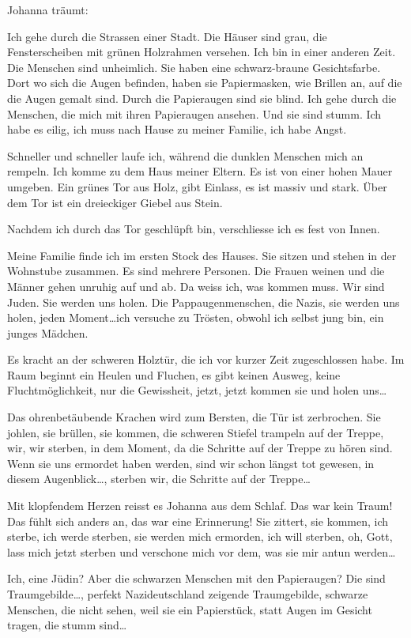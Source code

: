 \documentclass[10pt,a5paper]{book}
\begin{document}
Johanna träumt:

Ich gehe durch die Strassen einer Stadt. Die Häuser sind grau, die Fensterscheiben mit grünen Holzrahmen versehen. Ich bin in einer anderen Zeit. Die Menschen sind unheimlich. Sie haben eine schwarz-braune Gesichtsfarbe. Dort wo sich die Augen befinden, haben sie Papiermasken, wie Brillen an, auf die die Augen gemalt sind. Durch die Papieraugen sind sie blind. Ich gehe durch die Menschen,  die mich mit ihren Papieraugen ansehen. Und sie sind stumm. Ich habe es eilig, ich muss nach Hause zu meiner Familie, ich habe Angst.

Schneller und schneller laufe ich, während die dunklen Menschen mich an rempeln. Ich komme zu dem Haus meiner Eltern. Es ist von einer hohen Mauer umgeben. Ein grünes Tor aus Holz, gibt Einlass, es ist massiv und stark. Über dem Tor ist ein dreieckiger Giebel aus Stein. 

Nachdem ich durch das Tor geschlüpft bin, verschliesse ich es fest von Innen. 

Meine Familie finde ich im ersten Stock des Hauses. Sie sitzen und stehen in der Wohnstube zusammen. Es sind mehrere Personen. Die Frauen weinen und die Männer gehen unruhig auf und ab. Da weiss ich, was kommen muss. Wir sind Juden. Sie werden uns holen. Die Pappaugenmenschen, die Nazis, sie werden uns holen, jeden Moment\dots  ich versuche zu Trösten, obwohl ich selbst jung bin, ein junges Mädchen.

Es kracht an der schweren Holztür, die ich vor kurzer Zeit zugeschlossen habe. Im Raum beginnt ein Heulen und Fluchen, es gibt keinen Ausweg, keine Fluchtmöglichkeit, nur die Gewissheit, jetzt, jetzt kommen sie und holen uns\dots 

Das ohrenbetäubende Krachen wird zum Bersten, die Tür ist zerbrochen. Sie johlen, sie brüllen, sie kommen, die schweren Stiefel trampeln auf der Treppe, wir, wir sterben, in dem Moment, da die Schritte auf der Treppe zu hören sind. Wenn sie uns ermordet haben werden, sind wir schon längst tot gewesen, in diesem Augenblick\dots , sterben wir, die Schritte auf der Treppe\dots 

Mit klopfendem Herzen reisst es Johanna aus dem Schlaf. Das war kein Traum! Das fühlt sich anders an, das war eine Erinnerung! Sie zittert, sie kommen, ich sterbe, ich werde sterben, sie werden mich ermorden, ich will sterben, oh, Gott, lass mich jetzt sterben und verschone mich vor dem, was sie mir antun werden\dots 

Ich, eine Jüdin? Aber die schwarzen Menschen mit den Papieraugen? Die sind Traumgebilde\dots , perfekt Nazideutschland zeigende Traumgebilde, schwarze Menschen, die nicht sehen, weil sie ein Papierstück, statt Augen im Gesicht tragen, die stumm sind\dots 
\end{document}

